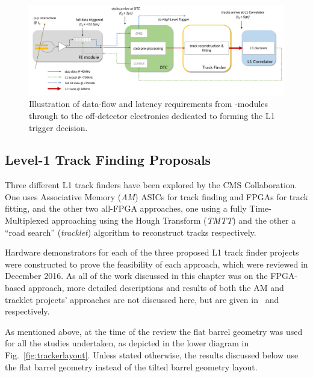 \begin{figure}[tb]
\centering
\includegraphics[width=\textwidth]{figs/tk-upgrade/dataflow.pdf}
\caption{Illustration of data-flow and latency requirements from \pt-modules through to the off-detector electronics dedicated to forming the L1 trigger decision.}
\label{fig:dataFlow}
\end{figure}

\subsection{Level-1 Track Finding Proposals}\label{subsec:TrackFinderReview}

Three different L1 track finders have been explored by the CMS Collaboration.
One uses Associative Memory (\emph{AM}) ASICs for track finding and FPGAs for track fitting, and the other two all-FPGA approaches, one using a fully Time-Multiplexed approaching using the Hough Transform (\emph{TMTT}) and the other a ``road search'' (\emph{tracklet}) algorithm to reconstruct tracks respectively.

Hardware demonstrators for each of the three proposed L1 track finder projects were constructed to prove the feasibility of each approach, which were reviewed in December 2016.
As all of the work discussed in this chapter was on the FPGA-based \HT approach, more detailed descriptions and results of both the AM and tracklet projects' approaches are not discussed here, but are given in~\cite{AM,P2TrackerTDR} and~\cite{tracklet,P2TrackerTDR} respectively.

As mentioned above, at the time of the review the flat barrel geometry was used for all the studies undertaken, as depicted in the lower diagram in Fig.~\ref{fig:trackerlayout}.
Unless stated otherwise, the results discussed below use the flat barrel geometry instead of the tilted barrel geometry layout.

